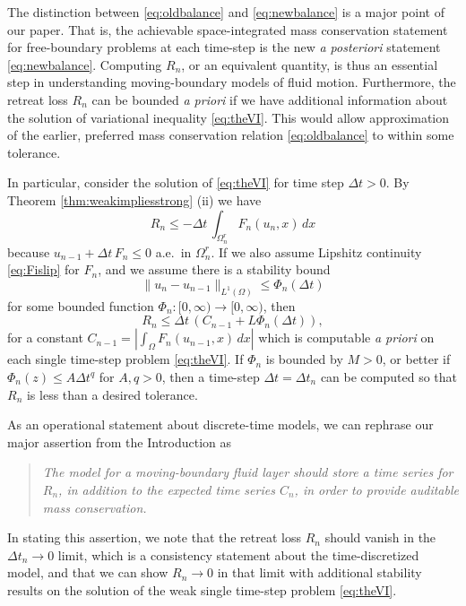 \documentclass[final,leqno,onefignum,onetabnum]{siamltex1213bueler}
\begin{document}
The distinction between \eqref{eq:oldbalance} and \eqref{eq:newbalance} is a major point of our paper.  That is, the achievable space-integrated mass conservation statement for free-boundary problems at each time-step is the new \emph{a posteriori} statement \eqref{eq:newbalance}.  Computing $R_n$, or an equivalent quantity, is thus an essential step in understanding moving-boundary models of fluid motion.  Furthermore, the retreat loss $R_n$ can be bounded \emph{a priori} if we have additional information about the solution of variational inequality \eqref{eq:theVI}.  This would allow approximation of the earlier, preferred mass conservation relation \eqref{eq:oldbalance} to within some tolerance.

In particular, consider the solution of \eqref{eq:theVI} for time step $\Delta t>0$.  By Theorem \ref{thm:weakimpliesstrong} (ii) we have
\begin{equation}
R_n \le - \Delta t\,\int_{\Omega_n^r} F_n(u_n,x)\,dx  \label{eq:earlyretreatbound}
\end{equation}
because $u_{n-1} + \Delta t\,F_n \le 0$ a.e.~in $\Omega_n^r$.  If we also assume Lipshitz continuity \eqref{eq:Fislip} for $F_n$, and we assume there is a stability bound
\begin{equation}
\|u_n-u_{n-1}\|_{L^1(\Omega)} \le \Phi_n(\Delta t)
\end{equation}
for some bounded function $\Phi_n : [0,\infty) \to [0,\infty)$, then
\begin{equation}
R_n \le \Delta t\,\left(C_{n-1} + L \Phi_n(\Delta t)\right),   \label{eq:retreatbound}
\end{equation}
for a constant $C_{n-1}=\left|\int_{\Omega} F_n(u_{n-1},x)\,dx\right|$ which is computable \emph{a priori} on each single time-step problem \eqref{eq:theVI}.  If $\Phi_n$ is bounded by $M>0$, or better if $\Phi_n(z) \le A \Delta t^q$ for $A,q>0$, then a time-step $\Delta t=\Delta t_n$ can be computed so that $R_n$ is less than a desired tolerance.

As an operational statement about discrete-time models, we can rephrase our major assertion from the Introduction as
\begin{quote}
\emph{The model for a moving-boundary fluid layer should store a time series for $R_n$, in addition to the expected time series $C_n$, in order to provide auditable mass conservation.}
\end{quote}
In stating this assertion, we note that the retreat loss $R_n$ should vanish in the $\Delta t_n\to 0$ limit, which is a consistency statement about the time-discretized model, and that we can show $R_n\to 0$ in that limit with additional stability results on the solution of the weak single time-step problem \eqref{eq:theVI}.
\end{document}
